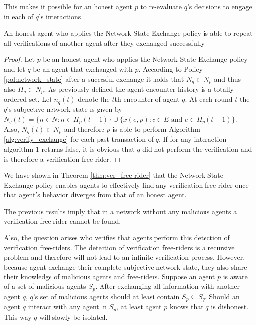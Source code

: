 This makes it possible for an honest agent $p$ to re-evaluate $q$'s decisions to engage in each of $q$'s 
interactions.

\begin{thm}
    \label{thm:ver_free-rider}
    An honest agent who applies the Network-State-Exchange policy is able to repeat all verifications
    of another agent after they exchanged successfully.
\end{thm}
\begin{proof}
    Let $p$ be an honest agent who applies the Network-State-Exchange policy and let $q$ be an agent
    that exchanged with $p$. According to Policy \ref{pol:network_state} after a succesful exchange
    it holds that $N_q \subset N_p$ and thus also $H_q \subset N_p$. As previously defined the agent encounter
    history is a totally ordered set. Let $n_q(t)$ denote the $t$th encounter of agent $q$. At each
    round $t$ the $q$'s subjective network state is given by $N_q(t) = \{ n \in N : n \in H_p(t-1) \} \cup \{ x(e, p) : e \in E \text{ and } e \in H_p(t-1) \}$.
    Also, $N_q(t) \subset N_p$ and therefore $p$ is able to perform Algorithm \ref{alg:verify_exchange}
    for each past transaction of $q$. If for any interaction algorithm $1$ returns false, it is 
    obvious that $q$ did not perform the verification and is therefore a verification free-rider.
\end{proof}

We have shown in Theorem \ref{thm:ver_free-rider} that the Network-State-Exchange policy enables 
agents to effectively find any verification free-rider once that agent's behavior diverges from that
of an honest agent. 

The previous results imply that in a network without any malicious agents a 
verification free-rider cannot be found. 

Also, the question arises who verifies that agents perform this detection of verification 
free-riders. The detection of verification free-riders is a recursive problem and therefore will not
lead to an infinite verification process. However, because agent exchange their complete subjective
network state, they also share their knowledge of malicious agents and free-riders. Suppose an agent
$p$ is aware of a set of malicious agents $S_p$. After exchanging all information with another agent
$q$, $q$'s set of malicious agents should at least contain $S_p \subseteq S_q$. Should an agent $q$ 
interact with any agent in $S_p$, at least agent $p$ knows that $q$ is dishonest. This way $q$ will 
slowly be isolated.

